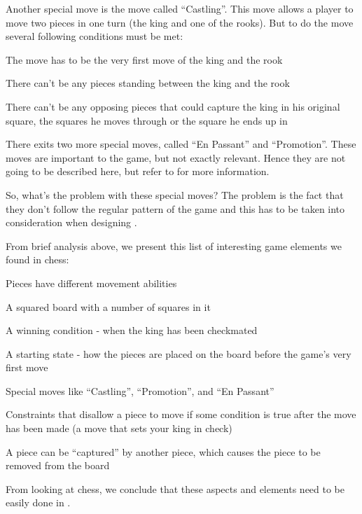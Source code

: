 Another special move is the move called ``Castling''. This move allows a player
to move two pieces in one turn (the king and one of the rooks). But to do the
move several following conditions must be met\cite{chessrules}:
\begin{nlist}
  \item The move has to be the very first move of the king and the rook
  \item There can't be any pieces standing between the king and the rook
  \item There can't be any opposing pieces that could capture the king in his
    original square, the squares he moves through or the square he ends up in
\end{nlist}

There exits two more special moves, called ``En Passant'' and
``Promotion''. These moves are important to the game, but not exactly
relevant. Hence they are not going to be described here, but refer to 
\cite{chessrules} for more information.

So, what's the problem with these special moves? The problem is the fact that
they don't follow the regular pattern of the game and this has to be taken into
consideration when designing \productname{}.


From brief analysis above, we present this list of interesting game elements we found 
in chess:

\begin{dlist}
\item Pieces have different movement abilities
\item A squared board with a number of squares in it
\item A winning condition - when the king has been checkmated
\item A starting state - how the pieces are placed on the board before the
  game's very first move
\item Special moves like ``Castling'', ``Promotion'', and ``En Passant''
\item Constraints that disallow a piece to move if some condition is true after
  the move has been made (a move that sets your king in check)
\item A piece can be ``captured'' by another piece, which causes the piece to be
  removed from the board
\end{dlist}

From looking at chess, we conclude that these aspects and elements need to be
easily done in \productname{}.
